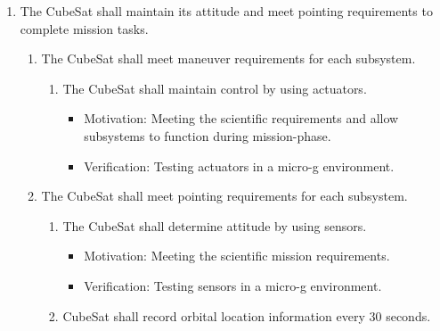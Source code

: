 \begin{enumerate}
\begin{enumerate}
\begin{enumerate}
\begin{enumerate}
\begin{itemize}
                                \item Motivation: Meeting the P-POD standard.
                                \item Verification: Test rig should be constructed to mimic the pusher plate and spring ejection system, with a full functional verification of the CubeSat performed afterwards along with a manual inspection to ensure all parts remain in place. 
                            \end{itemize}
                \end{enumerate}
        \end{enumerate}
    \end{enumerate} %
    \item The CubeSat shall maintain its attitude and meet pointing requirements to complete mission tasks.
    \begin{enumerate}
        \item The CubeSat shall meet maneuver requirements for each subsystem.
        \begin{enumerate}
            \item The CubeSat shall maintain control by using actuators. 
                \begin{itemize}
                    \item Motivation: Meeting the scientific requirements and allow subsystems to function during mission-phase.
                    \item Verification: Testing actuators in a micro-g environment.
                \end{itemize}
        \end{enumerate}
        \item The CubeSat shall meet pointing requirements for each subsystem.
        \begin{enumerate}
            \item The CubeSat shall determine attitude by using sensors.
                \begin{itemize}
                    \item Motivation: Meeting the scientific mission requirements.
                    \item Verification: Testing sensors in a micro-g environment.
                \end{itemize}
            \item CubeSat shall record orbital location information every 30 seconds.
            \begin{itemize}

\end{itemize}
\end{enumerate}
\end{enumerate}
\end{enumerate}
